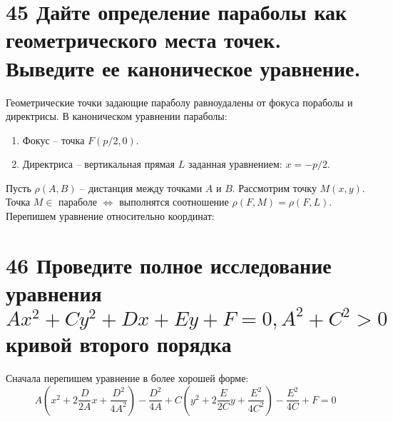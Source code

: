 \documentclass[a4paper,12pt]{article}
\begin{document}
\section{45 Дайте определение параболы как геометрического места точек. Выведите  ее каноническое уравнение.}
Геометрические точки задающие параболу равноудалены от фокуса пораболы и директрисы.
В каноническом уравнении параболы:
\begin{enumerate}
\item[] Фокус  – точка $ F(p/2, 0) $. 
\item[] Директриса – вертикальная прямая $L$ заданная 
уравнением: $ x = -p/2 $.
\end{enumerate}

\begin{center}
\end{center}

\smallskip 

Пусть $\rho(A,B) $ – дистанция между точками $A$ и $B$. Рассмотрим точку $M(x,y)$. Точка $M\in$
параболе $\iff$ выполнятся соотношение
$\rho(F,M) = \rho(F,L)$. Перепишем уравнение относительно 
координат:


\section{46 Проведите полное исследование уравнения \texorpdfstring{$ Ax^2 + Cy^2 + Dx + Ey + F = 0, A^2 + C^2 > 0$}{TEXT} кривой второго порядка}

Сначала перепишем уравнение в более хорошей форме:
\[
    A \left(  x^2 + 2\frac{D}{2A}x + \frac{D^2}{4A^2}  \right) - \frac{D^2}{4A} 
+ C \left(  y^2 + 2\frac{E}{2C}y + \frac{E^2}{4C^2}  \right) - \frac{E^2}{4C}
+ F = 0 
\]
\end{document}
